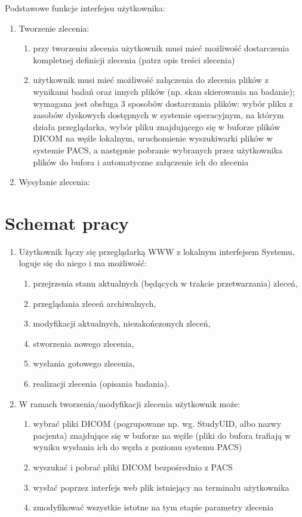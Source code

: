 \documentclass[a4paper]{report}
\begin{document}
Podstawowe funkcje interfejsu użytkownika:
\begin{enumerate}
  \item Tworzenie zlecenia:
      \begin{enumerate}
      \item przy tworzeniu zlecenia użytkownik musi mieć możliwość dostarczenia kompletnej definicji zlecenia (patrz opis treści zlecenia)
      \item użytkownik musi mieć możliwość załączenia do zlecenia plików z wynikami badań oraz innych plików (np. skan  skierowania na badanie); wymagana jest obsługa 3 sposobów dostarczania plików: wybór pliku z zasobów dyskowych dostępnych w systemie operacyjnym, na którym działa przeglądarka, wybór pliku znajdującego się w buforze plików DICOM na węźle lokalnym, uruchomienie wyszukiwarki plików w systemie PACS, a następnie pobranie wybranych przez użytkownika plików do bufora i automatyczne załączenie ich do zlecenia
      \end{enumerate}
  \item Wysyłanie zlecenia:
\end{enumerate}

\section{Schemat pracy}
\begin{enumerate}
\item Użytkownik łączy się przeglądarką WWW z lokalnym interfejsem Systemu, loguje się do niego i ma możliwość:
        \begin{enumerate}
        \item przejrzenia stanu aktualnych (będących w trakcie przetwarzania) zleceń,
        \item przeglądania zleceń archiwalnych,
        \item modyfikacji aktualnych, niezakończonych zleceń,
        \item stworzenia nowego zlecenia,
        \item wysłania gotowego zlecenia,
        \item realizacji zlecenia (opisania badania).
        \end{enumerate}
\item W ramach tworzenia/modyfikacji zlecenia użytkownik może:
        \begin{enumerate}
        \item wybrać pliki DICOM (pogrupowane np. wg. StudyUID, albo nazwy pacjenta) znajdujące się w buforze na węźle (pliki do bufora trafiają w wyniku wysłania ich do węzła z poziomu systemu PACS)
        \item wyszukać i pobrać pliki DICOM bezpośrednio z PACS
        \item wysłać poprzez interfejs web plik istniejący na terminalu użytkownika
        \item zmodyfikować wszystkie istotne na tym etapie parametry zlecenia
        \end{enumerate}
\end{enumerate}
\end{document}
